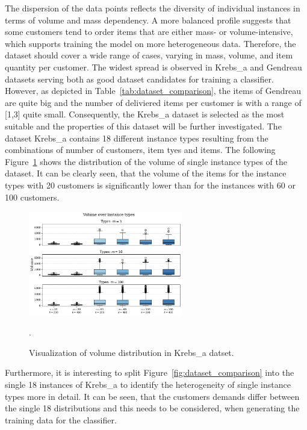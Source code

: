 The dispersion of the data points reflects the diversity of individual instances in terms of volume
and mass dependency. A more balanced profile suggests that some customers tend to order items that
are either mass- or volume-intensive, which supports training the model on more heterogeneous data.
Therefore, the dataset should cover a wide range of cases, varying in mass, volume, and item
quantity per customer. The widest spread is observed in Krebs\_a and Gendreau datasets serving
both as good dataset candidates for training a classifier. However, as depicted in Table~\ref{tab:dataset_comparison},
the items of Gendreau are quite big and the number of deliviered items per customer is with a range
of [1,3] quite small. Consequently, the Krebs\_a dataset is selected as the most suitable and the properties of this dataset will be further investigated.
\clearpage
The dataset Krebs\_a contains 18 different
instance types resulting from the combinations of number of customers, item tyes and items. The following Figure~\ref{fig:krebs_dataset_analysis} shows the distribution of the volume of single instance types of the dataset. It can be clearly seen, that the volume of the items for the instance types with 20 customers is significantly lower than for the instances with 60 or 100 customers.

\begin{figure}[h]
    \centering
    \includegraphics[width=0.6\textwidth]{pictures/volume_over_instances_krebs.png}
    \caption[Visualization of volume distribution in Krebs et al. (2021) dataset.]{Visualization of volume distribution in Krebs\_a datset.}.
    \label{fig:krebs_dataset_analysis}
\end{figure}

Furthermore, it is interesting to split Figure~\ref{fig:dataset_comparison} into the single 18 instances
of Krebs\_a to identify the heterogeneity of single instance types more in detail. It can be seen, that
the customers demands differ between the single 18 distributions and this needs to be considered, when
generating the training data for the classifier.

